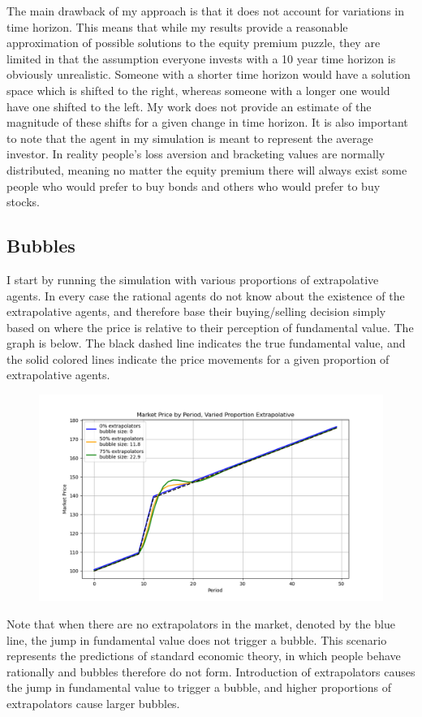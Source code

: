 \documentclass[10pt,twocolumn]{article}
\begin{document}
The main drawback of my approach is that it does not account for variations in time horizon. This means that while my results provide a reasonable approximation of possible solutions to the equity premium puzzle, they are limited in that the assumption everyone invests with a 10 year time horizon is obviously unrealistic. Someone with a shorter time horizon would have a solution space which is shifted to the right, whereas someone with a longer one would have one shifted to the left. My work does not provide an estimate of the magnitude of these shifts for a given change in time horizon. It is also important to note that the agent in my simulation is meant to represent the average investor. In reality people's loss aversion and bracketing values are normally distributed, meaning no matter the equity premium there will always exist some people who would prefer to buy bonds and others who would prefer to buy stocks.  

\subsection{Bubbles}
I start by running the simulation with various proportions of extrapolative agents. In every case the rational agents do not know about the existence of the extrapolative agents, and therefore base their buying/selling decision simply based on where the price is relative to their perception of fundamental value. The graph is below. The black dashed line indicates the true fundamental value, and the solid colored lines indicate the price movements for a given proportion of extrapolative agents. 
\begin{figure}[H]
    \centering
    \includegraphics[width=0.8\linewidth]{images/bubbles1.png}
    \label{fig:enter-label}
\end{figure}
Note that when there are no extrapolators in the market, denoted by the blue line, the jump in fundamental value does not trigger a bubble. This scenario represents the predictions of standard economic theory, in which people behave rationally and bubbles therefore do not form. Introduction of extrapolators causes the jump in fundamental value to trigger a bubble, and higher proportions of extrapolators cause larger bubbles.
\end{document}
